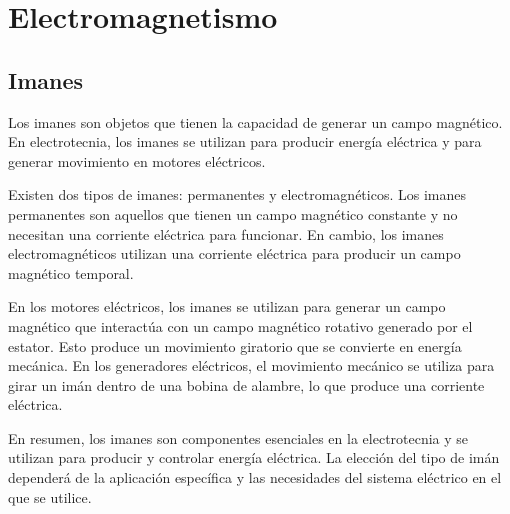 \documentclass[../main]{subfiles}
\begin{document}
\section{Electromagnetismo}


\subsection{Imanes}



Los imanes son objetos que tienen la capacidad de generar un campo magnético. En electrotecnia, los imanes se utilizan para producir energía eléctrica y para generar movimiento en motores eléctricos.

Existen dos tipos de imanes: permanentes y electromagnéticos. Los imanes permanentes son aquellos que tienen un campo magnético constante y no necesitan una corriente eléctrica para funcionar. En cambio, los imanes electromagnéticos utilizan una corriente eléctrica para producir un campo magnético temporal.

En los motores eléctricos, los imanes se utilizan para generar un campo magnético que interactúa con un campo magnético rotativo generado por el estator. Esto produce un movimiento giratorio que se convierte en energía mecánica. En los generadores eléctricos, el movimiento mecánico se utiliza para girar un imán dentro de una bobina de alambre, lo que produce una corriente eléctrica.

En resumen, los imanes son componentes esenciales en la electrotecnia y se utilizan para producir y controlar energía eléctrica. La elección del tipo de imán dependerá de la aplicación específica y las necesidades del sistema eléctrico en el que se utilice.
\end{document}
